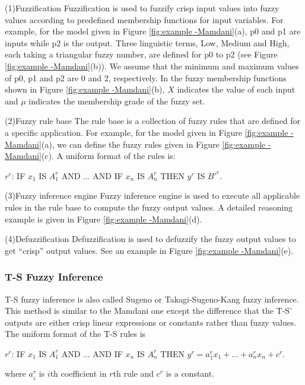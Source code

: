\documentclass[journal,a4paper,onecolumn]{article}
\begin{document}
(1)Fuzzification
Fuzzification is used to fuzzify crisp input values into fuzzy values according to predefined membership functions for input variables. 
For example, for the model given in Figure \ref{fig:example -Mamdani}(a), p0 and p1 are inputs while p2 is the output. Three linguistic terms, Low, Medium and High, each taking a triangular fuzzy number, are defined for p0 to p2 (see Figure \ref{fig:example -Mamdani}(b)). We assume that the minimum and maximum values of p0, p1 and p2 are 0 and 2, respectively. In the fuzzy membership functions shown in Figure \ref{fig:example -Mamdani}(b), $X$ indicates the value of each input and $\mu$ indicates the membership grade of the fuzzy set.

(2)Fuzzy rule base
The rule base is a collection of fuzzy rules that are defined for a specific application. 
For example, for the model given in Figure \ref{fig:example -Mamdani}(a), we can define the fuzzy rules given in Figure \ref{fig:example -Mamdani}(c).
A uniform format of the rules is:
\begin{center}
$r^r$: IF $x_1$ IS $A^r_1$ AND ... AND IF $x_n$ IS $A^r_n$ THEN $y^r$ IS ${B'}^r$.
\end{center}

(3)Fuzzy inference engine
Fuzzy inference engine is used to execute all applicable rules in the rule base to compute the fuzzy output values.
A detailed reasoning example is given in Figure \ref{fig:example -Mamdani}(d).

(4)Defuzzification
Defuzzification is used to defuzzify the fuzzy output values to get ``crisp'' output values.
See an example in Figure \ref{fig:example -Mamdani}(e).
 



\clearpage
\subsubsection{T-S Fuzzy Inference}

T-S fuzzy inference \cite{TS85} is also called Sugeno or Takagi-Sugeno-Kang fuzzy inference. This method is similar to the Mamdani one except the difference that the T-S' outputs are either crisp linear expressions or constants rather than fuzzy values. 
The uniform format of the T-S rules is
\begin{center}
	$r^r$: IF $x_1$ IS $A^r_1$ AND ... AND IF $x_n$ IS $A^r_n$ THEN $y^r=a^r_1x_1+...+a^r_nx_n+c^r$.
\end{center}
where $a^r_i$ is $i$th coefficient in $r$th rule and $c^r$ is a constant. 
\end{document}
